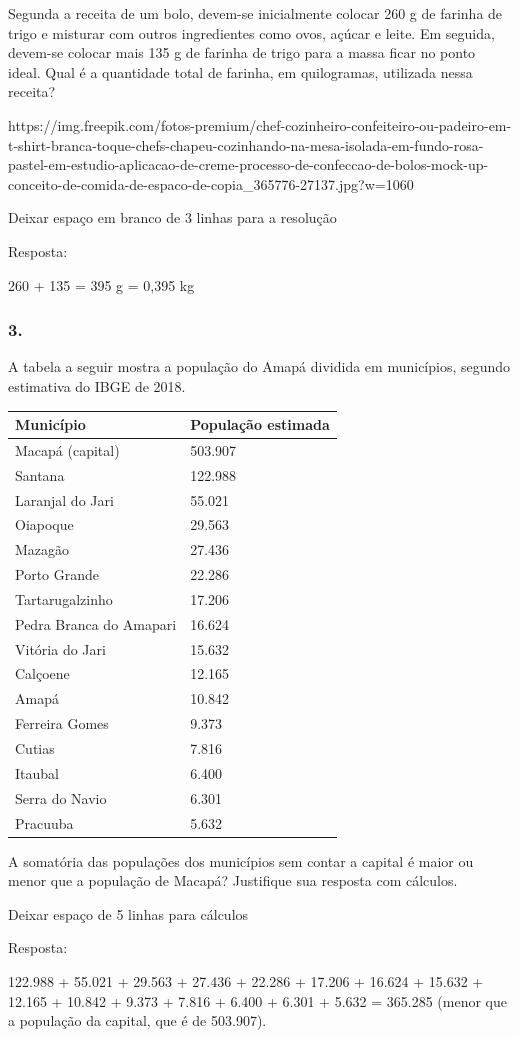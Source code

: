 \begin{enumerate}
Segunda a receita de um bolo, devem-se inicialmente colocar 260 g de farinha
de trigo e misturar com outros ingredientes como ovos, açúcar e leite.
Em seguida, devem-se colocar mais 135 g de farinha de trigo para a massa
ficar no ponto ideal. Qual é a quantidade total de farinha, em quilogramas,
utilizada nessa receita?

https://img.freepik.com/fotos-premium/chef-cozinheiro-confeiteiro-ou-padeiro-em-t-shirt-branca-toque-chefs-chapeu-cozinhando-na-mesa-isolada-em-fundo-rosa-pastel-em-estudio-aplicacao-de-creme-processo-de-confeccao-de-bolos-mock-up-conceito-de-comida-de-espaco-de-copia\_365776-27137.jpg?w=1060

Deixar espaço em branco de 3 linhas para a resolução

Resposta:

260 + 135 = 395 g = 0,395 kg

\subsubsection{3.}\label{section-15}

A tabela a seguir mostra a população do Amapá dividida em municípios, segundo estimativa do IBGE de 2018.

\begin{longtable}[]{@{}ll@{}}
\toprule
Município & População estimada\tabularnewline
\midrule
\endhead
Macapá (capital) & 503.907\tabularnewline
Santana & 122.988\tabularnewline
Laranjal do Jari & 55.021\tabularnewline
Oiapoque & 29.563\tabularnewline
Mazagão & 27.436\tabularnewline
Porto Grande & 22.286\tabularnewline
Tartarugalzinho & 17.206\tabularnewline
Pedra Branca do Amapari & 16.624\tabularnewline
Vitória do Jari & 15.632\tabularnewline
Calçoene & 12.165\tabularnewline
Amapá & 10.842\tabularnewline
Ferreira Gomes & 9.373\tabularnewline
Cutias & 7.816\tabularnewline
Itaubal & 6.400\tabularnewline
Serra do Navio & 6.301\tabularnewline
Pracuuba & 5.632\tabularnewline
\bottomrule
\end{longtable}

A somatória das populações dos municípios sem contar a capital é maior ou menor que a população de Macapá? Justifique sua resposta com cálculos.

Deixar espaço de 5 linhas para cálculos

Resposta:

122.988 + 55.021 + 29.563 + 27.436 + 22.286 + 17.206 + 16.624 + 15.632 + 12.165 + 10.842 + 9.373 + 7.816 + 6.400 + 6.301 + 5.632 = 365.285 (menor que a população da capital, que é de 503.907).


\end{enumerate}
